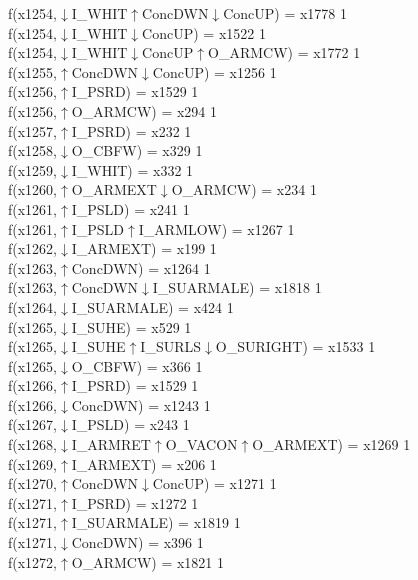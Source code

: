 f(x1254,$\downarrow$I\_WHIT$\uparrow$ConcDWN$\downarrow$ConcUP) = x1778 {1} \\
f(x1254,$\downarrow$I\_WHIT$\downarrow$ConcUP) = x1522 {1} \\
f(x1254,$\downarrow$I\_WHIT$\downarrow$ConcUP$\uparrow$O\_ARMCW) = x1772 {1} \\
f(x1255,$\uparrow$ConcDWN$\downarrow$ConcUP) = x1256 {1} \\
f(x1256,$\uparrow$I\_PSRD) = x1529 {1} \\
f(x1256,$\uparrow$O\_ARMCW) = x294 {1} \\
f(x1257,$\uparrow$I\_PSRD) = x232 {1} \\
f(x1258,$\downarrow$O\_CBFW) = x329 {1} \\
f(x1259,$\downarrow$I\_WHIT) = x332 {1} \\
f(x1260,$\uparrow$O\_ARMEXT$\downarrow$O\_ARMCW) = x234 {1} \\
f(x1261,$\uparrow$I\_PSLD) = x241 {1} \\
f(x1261,$\uparrow$I\_PSLD$\uparrow$I\_ARMLOW) = x1267 {1} \\
f(x1262,$\downarrow$I\_ARMEXT) = x199 {1} \\
f(x1263,$\uparrow$ConcDWN) = x1264 {1} \\
f(x1263,$\uparrow$ConcDWN$\downarrow$I\_SUARMALE) = x1818 {1} \\
f(x1264,$\downarrow$I\_SUARMALE) = x424 {1} \\
f(x1265,$\downarrow$I\_SUHE) = x529 {1} \\
f(x1265,$\downarrow$I\_SUHE$\uparrow$I\_SURLS$\downarrow$O\_SURIGHT) = x1533 {1} \\
f(x1265,$\downarrow$O\_CBFW) = x366 {1} \\
f(x1266,$\uparrow$I\_PSRD) = x1529 {1} \\
f(x1266,$\downarrow$ConcDWN) = x1243 {1} \\
f(x1267,$\downarrow$I\_PSLD) = x243 {1} \\
f(x1268,$\downarrow$I\_ARMRET$\uparrow$O\_VACON$\uparrow$O\_ARMEXT) = x1269 {1} \\
f(x1269,$\uparrow$I\_ARMEXT) = x206 {1} \\
f(x1270,$\uparrow$ConcDWN$\downarrow$ConcUP) = x1271 {1} \\
f(x1271,$\uparrow$I\_PSRD) = x1272 {1} \\
f(x1271,$\uparrow$I\_SUARMALE) = x1819 {1} \\
f(x1271,$\downarrow$ConcDWN) = x396 {1} \\
f(x1272,$\uparrow$O\_ARMCW) = x1821 {1} \\
